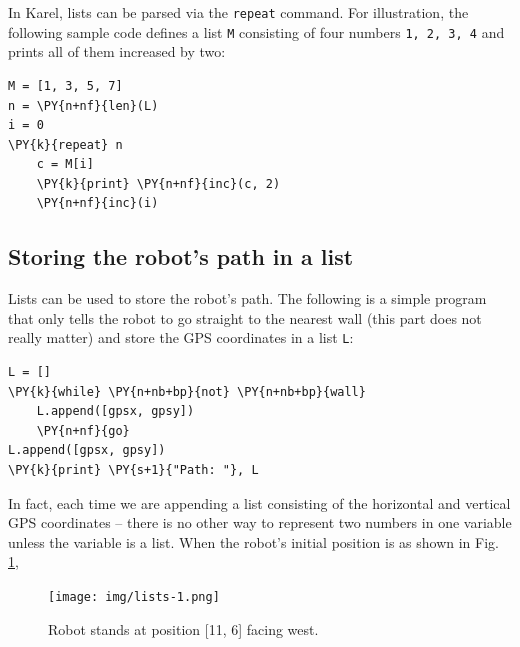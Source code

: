 In Karel, lists can be parsed via the {\tt repeat} command.
For illustration, the following sample code defines a list {\tt M} consisting of four numbers 
{\tt 1, 2, 3, 4} and prints all of them increased by two: \\

\begin{bbox}
\begin{Verbatim}[commandchars=\\\{\}]
M = [1, 3, 5, 7]
n = \PY{n+nf}{len}(L)
i = 0
\PY{k}{repeat} n
    c = M[i]
    \PY{k}{print} \PY{n+nf}{inc}(c, 2)
    \PY{n+nf}{inc}(i)
\end{Verbatim}
\end{bbox}
\vspace{6mm}

\subsection[\ \ Storing the robot's path in a list]{Storing the robot's path in a list}

\noindent
Lists can be used to store the robot's path. The following 
is a simple program that only tells the robot to go straight to the 
nearest wall (this part does not really matter) and store the GPS
coordinates in a list {\tt L}:\\

\begin{bbox}
\begin{Verbatim}[commandchars=\\\{\}]
L = []
\PY{k}{while} \PY{n+nb+bp}{not} \PY{n+nb+bp}{wall}
    L.append([gpsx, gpsy])
    \PY{n+nf}{go}
L.append([gpsx, gpsy])
\PY{k}{print} \PY{s+1}{"Path: "}, L
\end{Verbatim}
\end{bbox}
\vspace{6mm}

\noindent
In fact, each time we are appending a list consisting of the horizontal and 
vertical GPS coordinates -- there is no other way to represent two numbers 
in one variable unless the variable is a list. When the robot's initial position 
is as shown in Fig. \ref{fig:list-1},
\newpage

\begin{figure}[!ht]
\begin{center}
\texttt{[image: img/lists-1.png]}
\vspace{-0mm}
\caption{Robot stands at position [11, 6] facing west.}
\label{fig:list-1}
\end{center}
\end{figure}

